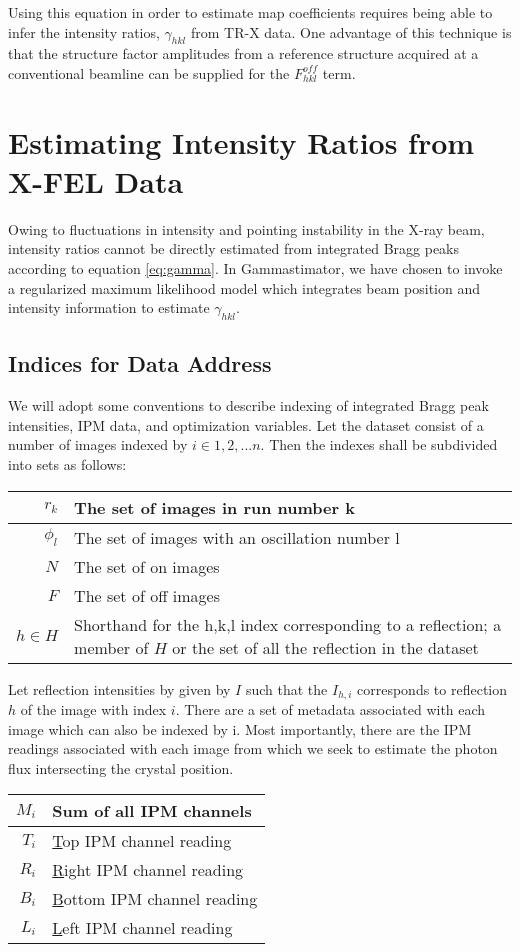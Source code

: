 \documentclass{report}
\begin{document}
Using this equation in order to estimate map coefficients requires being able to infer the intensity ratios, $\gamma_{hkl}$ from TR-X data. One advantage of this technique is that the structure factor amplitudes from a reference structure acquired at a conventional beamline can be supplied for the $F^{off}_{hkl}$ term. 

\section{Estimating Intensity Ratios from X-FEL Data}
Owing to fluctuations in intensity and pointing instability in the X-ray beam, intensity ratios cannot be directly estimated from integrated Bragg peaks according to equation \ref{eq:gamma}. 
In Gammastimator, we have chosen to invoke a regularized maximum likelihood model which integrates beam position and intensity information to estimate $\gamma_{hkl}$. 

\subsection{Indices for Data Address}
We will adopt some conventions to describe indexing of integrated Bragg peak intensities, IPM data, and optimization variables.
Let the dataset consist of a number of images indexed by $i\in {1, 2, ... n}$.
Then the indexes shall be subdivided into sets as follows:
\break


\begin{center}
\begin{tabular}{r | p{}}
$r_k$ & The set of images in run number k \\ \hline
$\phi_l$ & The set of images with an oscillation number l \\ \hline
$N$ & The set of on images \\ \hline
$F$ & The set of off images \\ \hline
$h\in H$ & Shorthand for the h,k,l index corresponding to a reflection; a member of $H$ or the set of all the reflection in the dataset
\end{tabular} 
\end{center}


Let reflection intensities by given by $I$ such that the $I_{h,i}$ corresponds to reflection $h$ of the image with index $i$. 
There are a set of metadata associated with each image which can also be indexed by i. 
Most importantly, there are the IPM readings associated with each image from which we seek to estimate the photon flux intersecting the crystal position.  
\break
\begin{center}
\begin{tabular}{r | l}
$M_i$ & Sum of all IPM channels\\ \hline
$T_i$ & \underline{T}op    IPM channel reading\\ \hline
$R_i$ & \underline{R}ight  IPM channel reading\\ \hline
$B_i$ & \underline{B}ottom IPM channel reading\\ \hline
$L_i$ & \underline{L}eft   IPM channel reading\\ 
\end{tabular}
\end{center}
\end{document}
